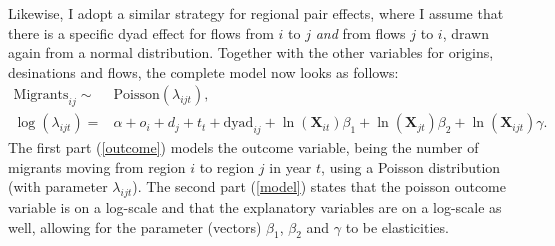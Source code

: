 \documentclass[11pt,parskip,abstracton,notitlepage, dvipsnames]{scrartcl}
\begin{document}
Likewise, I adopt a similar strategy for regional pair effects, where I assume
that there is a specific dyad effect for flows from $i$ to $j$ \emph{and} from
flows $j$ to $i$, drawn again from a normal distribution. Together with the
other variables for origins, desinations and flows, the complete model now looks
as follows:
\begin{subequations}
  \begin{align} \text{Migrants}_{ij} \sim & \text{Poisson}(\lambda_{ijt}), \label{outcome}\\
    \log(\lambda_{ijt}) = & \alpha + o_i + d_j + t_t + \text{dyad}_{ij} + \ln(\mathbf{X}_{it})\beta_1 + \ln(\mathbf{X}_{jt})\beta_2 + \ln(\mathbf{X}_{ijt})\gamma.  \label{model}
  \end{align}
  \label{eq:prefmodel}
\end{subequations}
The first part (\ref{outcome}) models the outcome variable, being the number of
migrants moving from region $i$ to region $j$ in year $t$, using a Poisson distribution
(with parameter $\lambda_{ijt}$). The second part (\ref{model}) states that the
poisson outcome variable is on a log-scale and that the explanatory variables
are on a log-scale as well, allowing for the parameter (vectors) $\beta_1$,
$\beta_2$ and $\gamma$ to be elasticities.
    
\end{document}
